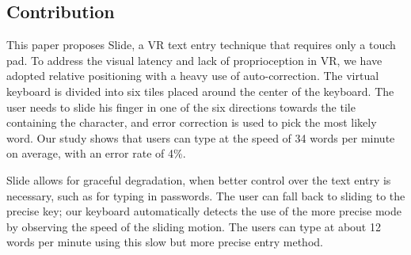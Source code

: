 \subsection{Contribution}
This paper proposes Slide, a VR text entry technique that requires only a touch pad.  To address the visual latency and lack of proprioception in VR, we have adopted relative positioning with a heavy use of auto-correction.  The virtual keyboard is divided into six tiles placed around the center of the keyboard.  The user needs to slide his finger in one of the six directions towards the tile containing the character, and error correction is used to pick the most likely word.  Our study shows that users can type at the speed of 34 words per minute on average, with an error rate of 4\%.   

Slide allows for graceful degradation, when better control over the text entry is necessary, such as for typing in passwords.  The user can fall back to sliding to the precise key; our keyboard automatically detects the use of the more precise mode by observing the speed of the sliding motion.  The users can type at about 12 words per minute using this slow but more precise entry method.


